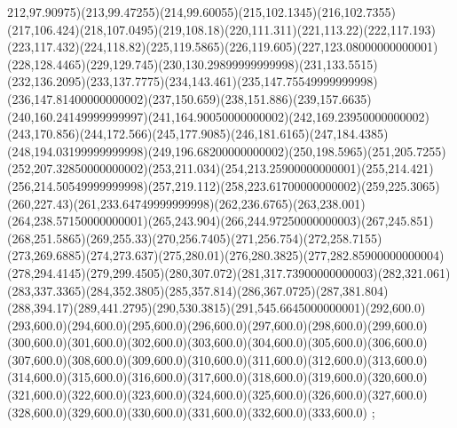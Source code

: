 {212,97.90975)(213,99.47255)(214,99.60055)(215,102.1345)(216,102.7355)(217,106.424)(218,107.0495)(219,108.18)(220,111.311)(221,113.22)(222,117.193)(223,117.432)(224,118.82)(225,119.5865)(226,119.605)(227,123.08000000000001)(228,128.4465)(229,129.745)(230,130.29899999999998)(231,133.5515)(232,136.2095)(233,137.7775)(234,143.461)(235,147.75549999999998)(236,147.81400000000002)(237,150.659)(238,151.886)(239,157.6635)(240,160.24149999999997)(241,164.90050000000002)(242,169.23950000000002)(243,170.856)(244,172.566)(245,177.9085)(246,181.6165)(247,184.4385)(248,194.03199999999998)(249,196.68200000000002)(250,198.5965)(251,205.7255)(252,207.32850000000002)(253,211.034)(254,213.25900000000001)(255,214.421)(256,214.50549999999998)(257,219.112)(258,223.61700000000002)(259,225.3065)(260,227.43)(261,233.64749999999998)(262,236.6765)(263,238.001)(264,238.57150000000001)(265,243.904)(266,244.97250000000003)(267,245.851)(268,251.5865)(269,255.33)(270,256.7405)(271,256.754)(272,258.7155)(273,269.6885)(274,273.637)(275,280.01)(276,280.3825)(277,282.85900000000004)(278,294.4145)(279,299.4505)(280,307.072)(281,317.73900000000003)(282,321.061)(283,337.3365)(284,352.3805)(285,357.814)(286,367.0725)(287,381.804)(288,394.17)(289,441.2795)(290,530.3815)(291,545.6645000000001)(292,600.0)(293,600.0)(294,600.0)(295,600.0)(296,600.0)(297,600.0)(298,600.0)(299,600.0)(300,600.0)(301,600.0)(302,600.0)(303,600.0)(304,600.0)(305,600.0)(306,600.0)(307,600.0)(308,600.0)(309,600.0)(310,600.0)(311,600.0)(312,600.0)(313,600.0)(314,600.0)(315,600.0)(316,600.0)(317,600.0)(318,600.0)(319,600.0)(320,600.0)(321,600.0)(322,600.0)(323,600.0)(324,600.0)(325,600.0)(326,600.0)(327,600.0)(328,600.0)(329,600.0)(330,600.0)(331,600.0)(332,600.0)(333,600.0)
};
